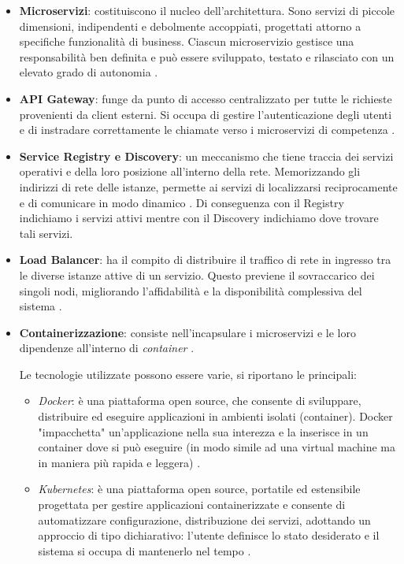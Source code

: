 \begin{itemize}
    \item \textbf{Microservizi}: costituiscono il nucleo dell’architettura. Sono servizi di piccole dimensioni, indipendenti e debolmente accoppiati, progettati attorno a specifiche funzionalità di business. Ciascun microservizio gestisce una responsabilità ben definita e può essere sviluppato, testato e rilasciato con un elevato grado di autonomia \cite{gfg_microservices, Dragoni2017, Richardson2018}.

    \item \textbf{API Gateway}: funge da punto di accesso centralizzato per tutte le richieste provenienti da client esterni. Si occupa di gestire l'autenticazione degli utenti e di instradare correttamente le chiamate verso i microservizi di competenza \cite{gfg_microservices, Richardson2018}.

    \item \textbf{Service Registry e Discovery}: un meccanismo che tiene traccia dei servizi operativi e della loro posizione all'interno della rete. Memorizzando gli indirizzi di rete delle istanze, permette ai servizi di localizzarsi reciprocamente e di comunicare in modo dinamico \cite{gfg_microservices, Richardson2018}.
    Di conseguenza con il Registry indichiamo i servizi attivi mentre con il Discovery indichiamo dove trovare tali servizi. 

    \item \textbf{Load Balancer}: ha il compito di distribuire il traffico di rete in ingresso tra le diverse istanze attive di un servizio. Questo previene il sovraccarico dei singoli nodi, migliorando l'affidabilità e la disponibilità complessiva del sistema \cite{gfg_microservices}.

    \item \textbf{Containerizzazione}: consiste nell'incapsulare i microservizi e le loro dipendenze all'interno di \textit{container} \cite{gfg_microservices}. 
    
    Le tecnologie utilizzate possono essere varie, si riportano le principali: 
    \begin{itemize}
        \item \textit{Docker}: è una piattaforma open source, che consente di sviluppare, distribuire ed eseguire applicazioni in ambienti isolati (container). 
        Docker "impacchetta" un'applicazione nella sua interezza e la inserisce in un container dove si può eseguire (in modo simile ad una virtual machine ma in maniera più rapida e leggera) \cite{DockerEngineDocs}.
        \item \textit{Kubernetes}: è una piattaforma open source, portatile ed estensibile progettata per gestire applicazioni containerizzate e consente di automatizzare configurazione, distribuzione dei servizi, adottando un approccio di tipo dichiarativo: l'utente definisce lo stato desiderato e il sistema si occupa di mantenerlo nel tempo \cite{KubernetesDocs}.
    \end{itemize}


\end{itemize}
